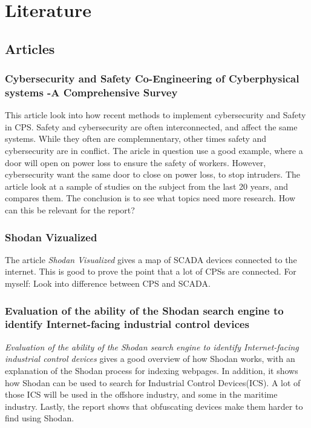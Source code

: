 \section{Literature} \label{sec:literature}
\subsection{Articles} \label{sec:articles}
\subsubsection{Cybersecurity and Safety Co-Engineering of Cyberphysical systems -A Comprehensive Survey}
This article look into how recent methods to implement cybersecurity and Safety in CPS. Safety and cybersecurity are often interconnected, and affect the same systems. While they often are complemnentary, other times safety and cybersecurity are in conflict. The aricle in question use a good example, where a door will open on power loss to ensure the safety of workers. However, cybersecurity want the same door to close on power loss, to stop intruders. The article look at a sample of studies on the subject from the last 20 years, and compares them. The conclusion is to see what topics need more research. How can this be relevant for the report?

\subsubsection{Shodan Vizualized}
The article \textit{Shodan Visualized} gives a map of SCADA devices connected to the internet.\cite{ercolani_patton_chen_2016} This is good to prove the point that a lot of CPSs are connected. For myself: Look into difference between CPS and SCADA. 

\subsubsection{Evaluation of the ability of the Shodan search engine to identify Internet-facing industrial control devices}
\textit{Evaluation of the ability of the Shodan search engine to identify Internet-facing industrial control devices} gives a good overview of how Shodan works, with an explanation of the Shodan process for indexing webpages.\cite{bodenheim_butts_dunlap_mullins_2014} 
In addition, it shows how Shodan can be used to search for Industrial Control Devices(ICS). A lot of those ICS will be used in the offshore industry, and some in the maritime industry. 
Lastly, the report shows that obfuscating devices make them harder to find using Shodan.

